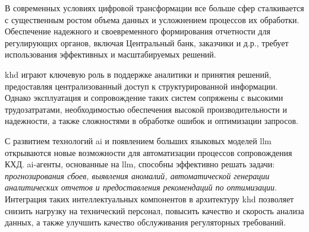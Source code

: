 \introduction %

В современных условиях цифровой трансформации все больше сфер сталкивается с существенным ростом объема данных и усложнением процессов их обработки. Обеспечение надежного и своевременного формирования отчетности для регулирующих органов, включая Центральный банк, заказчики и д.р., требует использования эффективных и масштабируемых решений. 

\gls{khd} играют ключевую роль в поддержке аналитики и принятия решений, предоставляя централизованный доступ к структурированной информации. Однако эксплуатация и сопровождение таких систем сопряжены с высокими трудозатратами, необходимостью обеспечения высокой производительности и надежности, а также сложностями в обработке ошибок и оптимизации запросов.

С развитием технологий \gls{ai} и появлением больших языковых моделей \gls{llm} открываются новые возможности для автоматизации процессов сопровождения КХД. \gls{ai}-агенты, основанные на \gls{llm}, способны эффективно решать задачи: \textit{прогнозирования сбоев, выявления аномалий, автоматической генерации аналитических отчетов и предоставления рекомендаций по оптимизации}. Интеграция таких интеллектуальных компонентов в архитектуру \gls{khd} позволяет снизить нагрузку на технический персонал, повысить качество и скорость анализа данных, а также улучшить качество обслуживания регуляторных требований.

